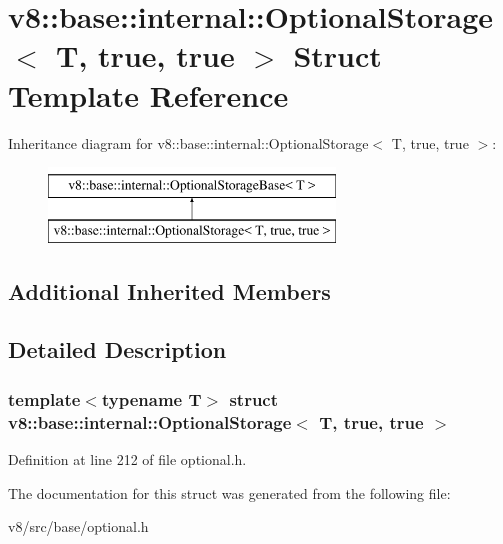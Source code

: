 \hypertarget{structv8_1_1base_1_1internal_1_1OptionalStorage_3_01T_00_01true_00_01true_01_4}{}\section{v8\+:\+:base\+:\+:internal\+:\+:Optional\+Storage$<$ T, true, true $>$ Struct Template Reference}
\label{structv8_1_1base_1_1internal_1_1OptionalStorage_3_01T_00_01true_00_01true_01_4}
Inheritance diagram for v8\+:\+:base\+:\+:internal\+:\+:Optional\+Storage$<$ T, true, true $>$\+:\begin{figure}[H]
\begin{center}
\leavevmode
\includegraphics[height=2.000000cm]{structv8_1_1base_1_1internal_1_1OptionalStorage_3_01T_00_01true_00_01true_01_4}
\end{center}
\end{figure}
\subsection*{Additional Inherited Members}


\subsection{Detailed Description}
\subsubsection*{template$<$typename T$>$\newline
struct v8\+::base\+::internal\+::\+Optional\+Storage$<$ T, true, true $>$}



Definition at line 212 of file optional.\+h.



The documentation for this struct was generated from the following file\+:\begin{DoxyCompactItemize}
\item 
v8/src/base/optional.\+h\end{DoxyCompactItemize}
